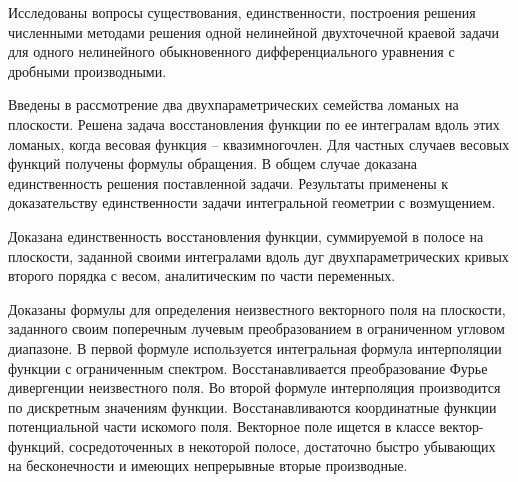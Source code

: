 Исследованы вопросы существования, единственности, построения решения численными методами решения одной нелинейной двухточечной краевой задачи для одного нелинейного обыкновенного дифференциального уравнения с дробными производными.





Введены в рассмотрение два двухпараметрических семейства ломаных на плоскости. Решена задача восстановления функции по ее интегралам вдоль этих ломаных, когда весовая функция – квазимногочлен. Для частных случаев весовых функций получены формулы обращения. В общем случае доказана единственность решения поставленной задачи. Результаты применены к доказательству единственности задачи интегральной геометрии с возмущением.


Доказана единственность восстановления функции, суммируемой в полосе на плоскости, заданной своими интегралами вдоль дуг двухпараметрических кривых второго порядка с весом, аналитическим по части переменных.

Доказаны формулы для определения неизвестного векторного поля на плоскости, заданного своим поперечным лучевым преобразованием в ограниченном угловом диапазоне. В первой формуле используется интегральная формула интерполяции функции с ограниченным спектром. Восстанавливается преобразование Фурье дивергенции неизвестного поля. Во второй формуле интерполяция производится по дискретным значениям функции. Восстанавливаются координатные функции потенциальной части искомого поля. Векторное поле ищется в классе вектор-функций, сосредоточенных в некоторой полосе, достаточно быстро убывающих на бесконечности и имеющих непрерывные вторые производные.


